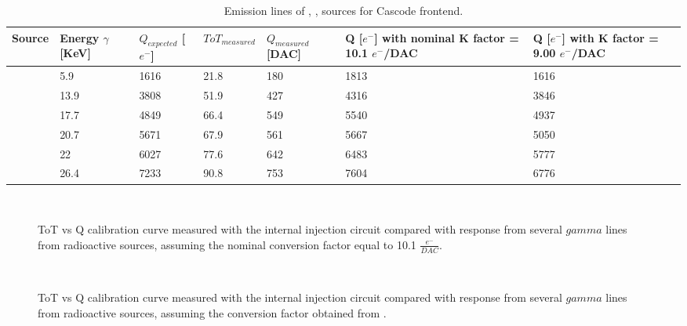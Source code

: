 \begin{table}[h!]
\centering
\begin{tabular}{C{1.5cm}|C{1.8cm}|C{1.8cm}|C{1.8cm}|C{1.8cm}|C{1.8cm}|C{1.8cm}}
\hline
Source & Energy $\gamma$ [KeV] & $Q_{expected}$ [$e^{-}$] & $ToT_{measured}$ & $Q_{measured}$ [DAC] & Q [$e^{-}$] \footnotesize{with nominal K factor = 10.1 $e^{-}$/DAC} & Q [$e^{-}$] \footnotesize{with  K factor = 9.00 $e^{-}$/DAC}\\[2ex]
\hline
\hline
{} & 5.9 & 1616 & 21.8 & 180 & 1813 & 1616 \\[0.5ex]
\hline
{} & 13.9 & 3808 & 51.9 & 427 & 4316 & 3846 \\[0.5ex]
\hline
{} & 17.7 & 4849 & 66.4 & 549 & 5540 & 4937 \\[0.5ex]
\hline
{} & 20.7 & 5671 & 67.9 & 561 & 5667 & 5050 \\[0.5ex]
\hline
{} & 22 & 6027 & 77.6 & 642 & 6483 & 5777 \\[0.5ex]
\hline
{} & 26.4 & 7233 & 90.8 & 753 & 7604 & 6776 \\[0.5ex]
\hline
\hline
\end{tabular}
\caption{Emission lines of , ,  sources for Cascode frontend.}
\label{tab:source_conv_casc}
\end{table}




\begin{figure}
\centering
{}\quad
{}\\
\caption{ToT vs Q calibration curve measured with the internal injection circuit compared with response from several $gamma$ lines from radioactive sources, assuming the nominal conversion factor equal to 10.1 $\frac{e^{-}}{DAC}$.}
\label{fig:inj_cap_10}
\end{figure} 


\begin{figure}[h!]
\centering
{}\quad
{}\\
\caption{ToT vs Q calibration curve measured with the internal injection circuit compared with response from several $gamma$ lines from radioactive sources, assuming the conversion factor obtained from .}
\label{fig:inj_cap_sources}
\end{figure} 





